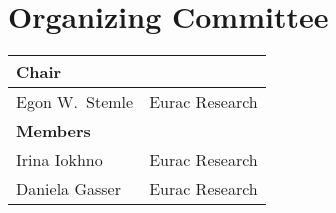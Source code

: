 \bigskip
\section*{Organizing Committee}
\begin{longtable}{p{}p{}}
       \textbf{Chair} \\ \hline
    Egon W.~Stemle & Eurac Research %
       \medskip \\ \textbf{Members} \\ \hline
    Irina Iokhno & Eurac Research\\
    Daniela Gasser & Eurac Research\\
\end{longtable}
\clearpage
